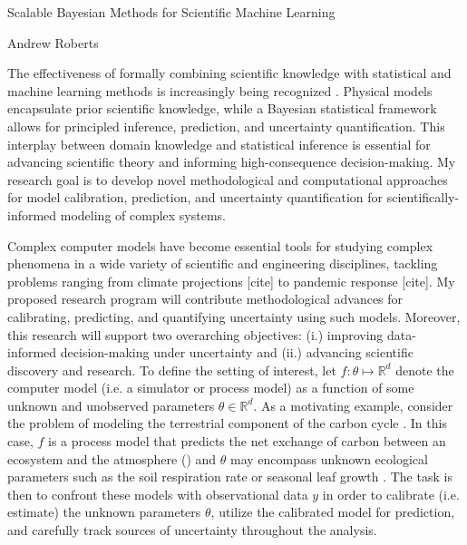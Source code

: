 \documentclass[12pt]{article}
\newcommand{\R}{\mathcal{R}}
\def\R{\mathbb{R}}
\begin{document}
\begin{center}
Scalable Bayesian Methods for Scientific Machine Learning
\end{center}

\begin{flushright}
Andrew Roberts
\end{flushright} 

The effectiveness of formally combining scientific knowledge with statistical and machine learning methods is increasingly being recognized \cite{Willcox, Laubmeier, Wikle}. Physical models
encapsulate prior scientific knowledge, while a Bayesian statistical framework allows for principled inference, prediction, and uncertainty quantification. This interplay between domain 
knowledge and statistical inference is essential for advancing scientific theory and informing high-consequence decision-making. My research goal is to develop novel methodological 
and computational approaches for model calibration, prediction, and uncertainty quantification for scientifically-informed modeling of complex systems. 

Complex computer models have become essential tools for studying complex phenomena in a wide variety of scientific and engineering disciplines, 
tackling problems ranging from climate projections [cite] to pandemic response [cite]. My proposed research program will contribute methodological 
advances for calibrating, predicting, and quantifying uncertainty using such models. Moreover, this research will support two 
overarching objectives: (i.) improving data-informed decision-making under uncertainty and (ii.) advancing scientific discovery and research. To define the 
setting of interest, let $f: \theta \mapsto \R^d$ denote the computer model (i.e. a simulator or process model) as a function of some unknown and unobserved
parameters $\theta \in \R^d$. As a motivating example, consider the problem of modeling the terrestrial component of the carbon cycle \cite{Friedlingstein}. 
In this case, $f$ is a process model that predicts the net exchange of carbon between an ecosystem and the atmosphere (\cite{Waring}) and $\theta$ may encompass 
unknown ecological parameters such as the soil respiration rate or seasonal leaf growth \cite{Fer}. The task is then to confront these models with observational data $y$ in 
order to calibrate (i.e. estimate) the unknown parameters $\theta$, utilize the calibrated model for prediction, and carefully track sources of uncertainty throughout the analysis. 
\end{document}
